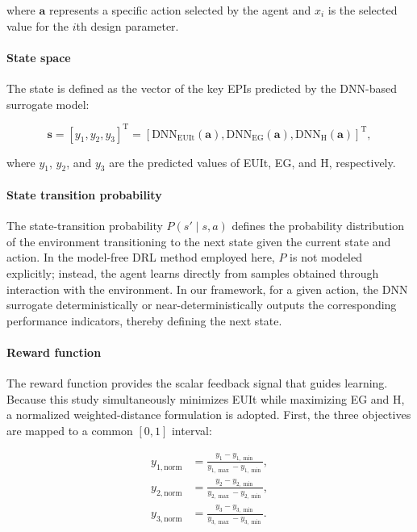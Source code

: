 \documentclass[final,3p,times]{elsarticle}
\begin{document}
where $\mathbf{a}$ represents a specific action selected by the agent and $x_i$ is the selected value for the $i$th design parameter.

\paragraph{State space}
The state is defined as the vector of the key EPIs predicted by the DNN-based surrogate model:

\begin{equation}
\mathbf{s} = [y_1,y_2,y_3]^{\mathrm{T}} =
\left[
\mathrm{DNN}_{\mathrm{EUIt}}(\mathbf{a}),
\mathrm{DNN}_{\mathrm{EG}}(\mathbf{a}),
\mathrm{DNN}_{\mathrm{H}}(\mathbf{a})
\right]^{\mathrm{T}},
\end{equation}

where $y_1$, $y_2$, and $y_3$ are the predicted values of EUIt, EG, and H, respectively.

\paragraph{State transition probability}
The state-transition probability $P(s' \mid s,a)$ defines the probability distribution of the environment transitioning to the next state given the current state and action. In the model-free DRL method employed here, $P$ is not modeled explicitly; instead, the agent learns directly from samples obtained through interaction with the environment. In our framework, for a given action, the DNN surrogate deterministically or near-deterministically outputs the corresponding performance indicators, thereby defining the next state.

\paragraph{Reward function}
The reward function provides the scalar feedback signal that guides learning. Because this study simultaneously minimizes EUIt while maximizing EG and H, a normalized weighted-distance formulation is adopted. First, the three objectives are mapped to a common $[0,1]$ interval:

\begin{equation}
\begin{aligned}
y_{1,\mathrm{norm}} &= \frac{y_1-y_{1,\min}}{y_{1,\max}-y_{1,\min}}, \\
y_{2,\mathrm{norm}} &= \frac{y_2-y_{2,\min}}{y_{2,\max}-y_{2,\min}}, \\
y_{3,\mathrm{norm}} &= \frac{y_3-y_{3,\min}}{y_{3,\max}-y_{3,\min}}.
\end{aligned}
\end{equation}
\end{document}
